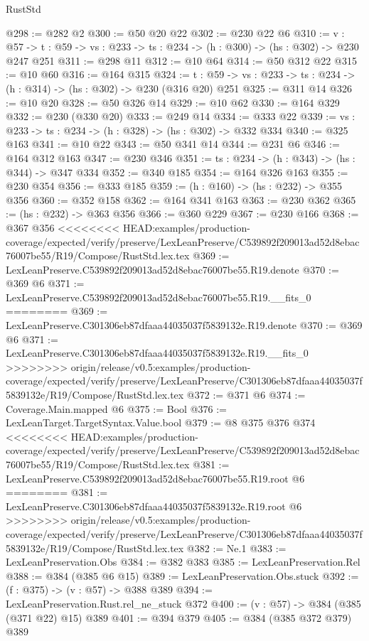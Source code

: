 \begin{lexlean}{RustStd}
\begin{coremodule}
{\begin{coremodule}
@298 := @282 @2
@300 := @50 @20 @22
@302 := @230 @22 @6
@310 := {v : @57} ->
  {t : @59} -> {vs : @233} -> {ts : @234} -> (h : @300) -> (hs : @302) -> @230 @247 @251
@311 := @298 @11
@312 := @10 @64
@314 := @50 @312 @22
@315 := @10 @60
@316 := @164 @315
@324 := {t : @59} -> {vs : @233} -> {ts : @234} -> (h : @314) -> (hs : @302) -> @230 (@316 @20) @251
@325 := @311 @14
@326 := @10 @20
@328 := @50 @326 @14
@329 := @10 @62
@330 := @164 @329
@332 := @230 (@330 @20)
@333 := @249 @14
@334 := @333 @22
@339 := {vs : @233} -> {ts : @234} -> (h : @328) -> (hs : @302) -> @332 @334
@340 := @325 @163
@341 := @10 @22
@343 := @50 @341 @14
@344 := @231 @6
@346 := @164 @312 @163
@347 := @230 @346
@351 := {ts : @234} -> (h : @343) -> (hs : @344) -> @347 @334
@352 := @340 @185
@354 := @164 @326 @163
@355 := @230 @354
@356 := @333 @185
@359 := (h : @160) -> (hs : @232) -> @355 @356
@360 := @352 @158
@362 := @164 @341 @163
@363 := @230 @362
@365 := (hs : @232) -> @363 @356
@366 := @360 @229
@367 := @230 @166
@368 := @367 @356
<<<<<<<< HEAD:examples/production-coverage/expected/verify/preserve/LexLeanPreserve/C539892f209013ad52d8ebac76007be55/R19/Compose/RustStd.lex.tex
@369 := LexLeanPreserve.C539892f209013ad52d8ebac76007be55.R19.denote
@370 := @369 @6
@371 := LexLeanPreserve.C539892f209013ad52d8ebac76007be55.R19.__fits_0
========
@369 := LexLeanPreserve.C301306eb87dfaaa44035037f5839132e.R19.denote
@370 := @369 @6
@371 := LexLeanPreserve.C301306eb87dfaaa44035037f5839132e.R19.__fits_0
>>>>>>>> origin/release/v0.5:examples/production-coverage/expected/verify/preserve/LexLeanPreserve/C301306eb87dfaaa44035037f5839132e/R19/Compose/RustStd.lex.tex
@372 := @371 @6
@374 := Coverage.Main.mapped @6
@375 := Bool
@376 := LexLeanTarget.TargetSyntax.Value.bool
@379 := @8 @375 @376 @374
<<<<<<<< HEAD:examples/production-coverage/expected/verify/preserve/LexLeanPreserve/C539892f209013ad52d8ebac76007be55/R19/Compose/RustStd.lex.tex
@381 := LexLeanPreserve.C539892f209013ad52d8ebac76007be55.R19.root @6
========
@381 := LexLeanPreserve.C301306eb87dfaaa44035037f5839132e.R19.root @6
>>>>>>>> origin/release/v0.5:examples/production-coverage/expected/verify/preserve/LexLeanPreserve/C301306eb87dfaaa44035037f5839132e/R19/Compose/RustStd.lex.tex
@382 := Ne.{1}
@383 := LexLeanPreservation.Obs
@384 := @382 @383
@385 := LexLeanPreservation.Rel
@388 := @384 (@385 @6 @15)
@389 := LexLeanPreservation.Obs.stuck
@392 := (f : @375) -> (v : @57) -> @388 @389
@394 := LexLeanPreservation.Rust.rel_ne_stuck @372
@400 := (v : @57) -> @384 (@385 (@371 @22) @15) @389
@401 := @394 @379
@405 := @384 (@385 @372 @379) @389

\end{coremodule}}
\end{coremodule}
\end{lexlean}
